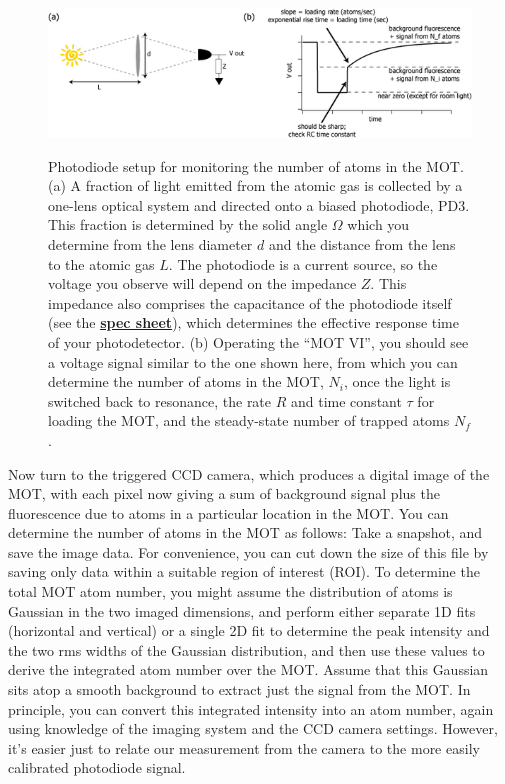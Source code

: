 \documentclass{../lab}
\begin{document}
\begin{figure}[h]
    \centering
    \href{http://experimentationlab.berkeley.edu/sites/default/files/images/600px-PD3_v2.png}{\includegraphics[width=0.9\linewidth]{images/600px-PD3_v2.png}}
    \caption{Photodiode setup for monitoring the number of atoms in the MOT. (a) A fraction of light emitted from the atomic gas is collected by a one-lens optical system and directed onto a biased photodiode, PD3. This fraction is determined by the solid angle $\Omega$ which you determine from the lens diameter $d$ and the distance from the lens to the atomic gas $L$. The photodiode is a current source, so the voltage you observe will depend on the impedance $Z$. This impedance also comprises the capacitance of the photodiode itself (see the \href{http://experimentationlab.berkeley.edu/sites/default/files/images/Photodiode\_info.pdf}{\textbf{spec sheet}}), which determines the effective response time of your photodetector. (b) Operating the ``MOT VI'', you should see a voltage signal similar to the one shown here, from which you can determine the number of atoms in the MOT, $N_i$, once the light is switched back to resonance, the rate $R$ and time constant $\tau$ for loading the MOT, and the steady-state number of trapped atoms $N_f$.}
    \label{fig:600px-PD3_v2}
\end{figure}

Now turn to the triggered CCD camera, which produces a digital image of the MOT, with each pixel now giving a sum of background signal plus the fluorescence due to atoms in a particular location in the MOT. You can determine the number of atoms in the MOT as follows: Take a snapshot, and save the image data. For convenience, you can cut down the size of this file by saving only data within a suitable region of interest (ROI). To determine the total MOT atom number, you might assume the distribution of atoms is Gaussian in the two imaged dimensions, and perform either separate 1D fits (horizontal and vertical) or a single 2D fit to determine the peak intensity and the two rms widths of the Gaussian distribution, and then use these values to derive the integrated atom number over the MOT. Assume that this Gaussian sits atop a smooth background to extract just the signal from the MOT. In principle, you can convert this integrated intensity into an atom number, again using knowledge of the imaging system and the CCD camera settings. However, it's easier just to relate our measurement from the camera to the more easily calibrated photodiode signal.
\end{document}
